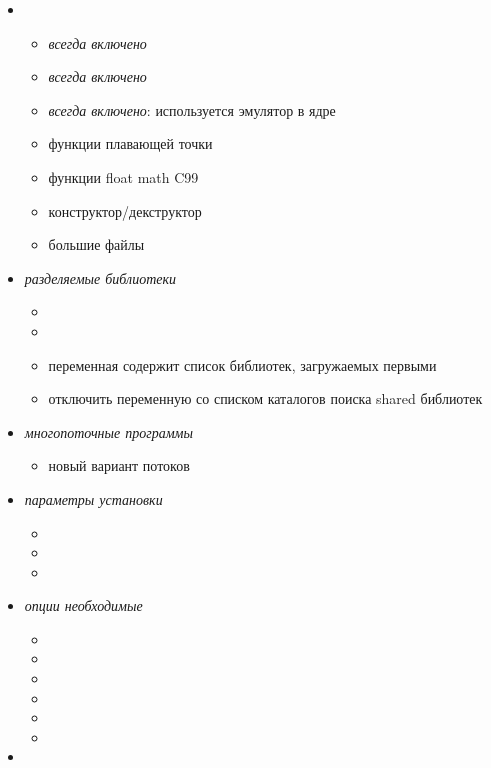 \begin{itemize}
\item
\begin{itemize}
\item {} \emph{всегда включено}
\item {} \emph{всегда включено}
\item {} \emph{всегда включено}: используется эмулятор в
ядре
\item {} функции плавающей точки
\item {} функции float math C99
\item {} конструктор/декструктор
\item {} большие файлы
\end{itemize}
\item \emph{разделяемые  библиотеки}
\begin{itemize}
  \item {}
  \item {} 
  \item {} переменная 
  содержит список библиотек, загружаемых первыми
  \item {} отключить
  переменную  со списком каталогов поиска shared
  библиотек
\end{itemize}
\item \emph{многопоточные  программы }
\begin{itemize}
  \item {} новый вариант потоков
\end{itemize}
\item \emph{параметры установки}
\begin{itemize}
\item {}
\item {}
\item {}
\end{itemize}
\item \emph{опции необходимые }
\begin{itemize}
\item {}
\item {}
\item {}
\item {} 
\item {}
\item {}
\end{itemize}
\item
\begin{itemize}
\end{itemize}
\end{itemize}

